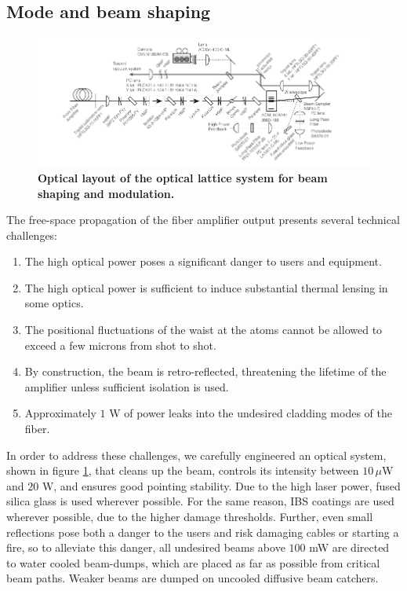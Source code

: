 \documentclass[twocolumn,aps,pra,showpacs,preprintnumbers,bibnotes]{revtex4-1}
\begin{document}
\subsection{Mode and beam shaping}

\begin{figure}
  \begin{center}
    \includegraphics{fig/optical_layout_wide.pdf}
    \caption{\textbf{Optical layout of the optical lattice system for beam shaping and modulation.}}\label{fig:optical_layout}
  \end{center}
\end{figure}

The free-space propagation of the fiber amplifier output presents several technical challenges:
\begin{enumerate}
  \item The high optical power poses a significant danger to users and equipment.
  \item The high optical power is sufficient to induce substantial thermal lensing in some optics. 
  \item The positional fluctuations of the waist at the atoms cannot be allowed to exceed a few microns from shot to shot. 
\item By construction, the beam is retro-reflected, threatening the lifetime of the amplifier unless sufficient isolation is used. 
\item Approximately $1$ W of power leaks into the undesired cladding modes of the fiber. 
  \end{enumerate}

In order to address these challenges, we carefully engineered an optical system, shown in figure \ref{fig:optical_layout}, that cleans up the beam, controls its intensity between $10\,\mu$W and $20$ W, and ensures good pointing stability.
Due to the high laser power, fused silica glass is used wherever possible.
For the same reason, IBS coatings are used wherever possible, due to the higher damage thresholds.
Further, even small reflections pose both a danger to the users and risk damaging cables or starting a fire, so to alleviate this danger, all undesired beams above $100$ mW are directed to water cooled beam-dumps, which are placed as far as possible from critical beam paths. 
Weaker beams are dumped on uncooled diffusive beam catchers.
\end{document}
